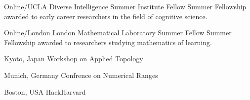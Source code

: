 {%
	Online/UCLA}
{%
	Diverse Intelligence Summer Institute Fellow}
{
	Summer Fellowship awarded to early career researchers in the field of cognitive science. 
}

{%
	Online/London}
{%
	London Mathematical Laboratory Summer Fellow}
{
	Summer Fellowship awarded to researchers studying mathematics of learning. 
}

{%
	Kyoto, Japan}
{%
	Workshop on Applied Topology}
{}

{%
	Munich, Germany}
{%
	Confrence on Numerical Ranges}
{}

{%
	Boston, USA}
{%
	HackHarvard}
{}
